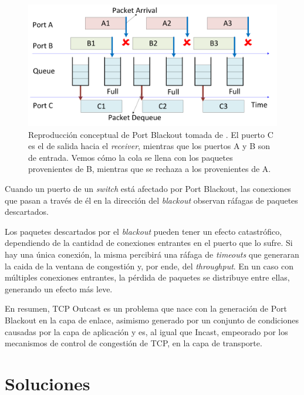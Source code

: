 \documentclass[runningheads,a4paper]{llncs}
\begin{document}
\begin{figure}[t!]
    \centering
    \includegraphics[width=1\textwidth]{figures/TCP_Outcast_Example.png}
    \caption{Reproducción conceptual de Port Blackout tomada de \cite{Prakash_Outcast_2012}. El puerto C es el de salida hacia el \textit{receiver}, mientras que los puertos A y B son de entrada. Vemos cómo la cola se llena con los paquetes provenientes de B, mientras que se rechaza a los provenientes de A.}
    \label{fig:port_blackout_example}
\end{figure}

Cuando un puerto de un \textit{switch} está afectado por Port Blackout, las conexiones que pasan a través de él en la dirección del \textit{blackout} observan ráfagas de paquetes descartados.

Los paquetes descartados por el \textit{blackout} pueden tener un efecto catastrófico, dependiendo de la cantidad de conexiones entrantes en el puerto que lo sufre. Si hay una única conexión, la misma percibirá una ráfaga de \textit{timeouts} que generaran la caida de la ventana de congestión y, por ende, del \textit{throughput}. En un caso con múltiples conexiones entrantes, la pérdida de paquetes se distribuye entre ellas, generando un efecto más leve.

En resumen, TCP Outcast es un problema que nace con la generación de Port Blackout en la capa de enlace, asimismo generado por un conjunto de condiciones causadas por la capa de aplicación y es, al igual que Incast, empeorado por los mecanismos de control de congestión de TCP, en la capa de transporte.

\newpage

\section{Soluciones} \label{solutions}

\end{document}
